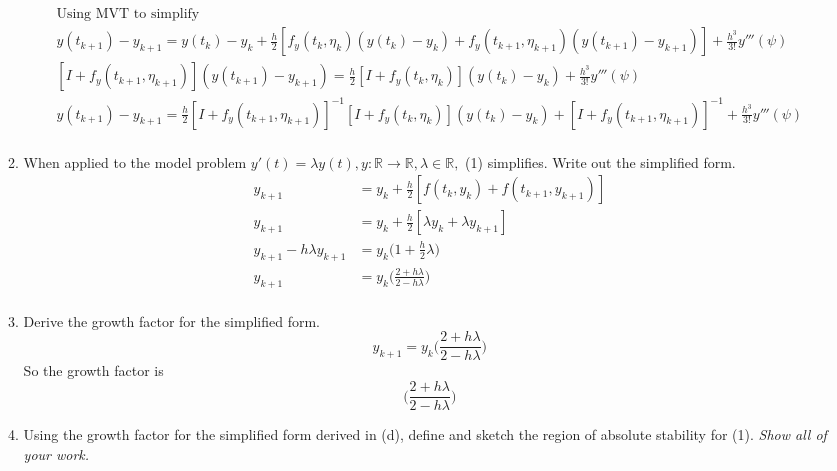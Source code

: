 \documentclass{article}
\begin{document}
\begin{enumerate}
\begin{enumerate}
\begin{align*}
                    \text{Using MVT to simplify} \\
                    y(t_{k+1}) - y_{k+1} = 
                    y(t_k) - y_k + \frac{h}{2}
                    [f_y (t_k, \eta_k)(y(t_k) - y_k) 
                    + f_y (t_{k+1}, \eta_{k+1})(y(t_{k+1}) - y_{k+1})]
                    + \frac{h^3}{3!}y'''(\psi) \\
                    [I + f_y (t_{k+1}, \eta_{k+1})](y(t_{k+1}) - y_{k+1}) 
                    = \frac{h}{2}
                    [I + f_y (t_k, \eta_k)](y(t_k) - y_k)
                    + \frac{h^3}{3!}y'''(\psi) \\
                    y(t_{k+1}) - y_{k+1}
                    = \frac{h}{2}
                    [I + f_y (t_{k+1}, \eta_{k+1})]^{-1}
                    [I + f_y (t_k, \eta_k)](y(t_k) - y_k)
                    + [I + f_y (t_{k+1}, \eta_{k+1})]^{-1}
                    + \frac{h^3}{3!}y'''(\psi) \\
                \end{align*}
            \item When applied to the model problem $y'(t) = \lambda y(t),
                y: \mathbb{R} \rightarrow \mathbb{R}, \lambda \in 
                \mathbb{R},$ (1) simplifies. Write out the simplified form.
                \begin{align*}
                y_{k+1} &= y_k + \frac{h}{2}[f(t_k,y_k) 
                + f(t_{k+1}, y_{k+1})] \\
                y_{k+1} &= y_k + \frac{h}{2}[\lambda y_k
                + \lambda y_{k+1}] \\
                y_{k+1} - h\lambda y_{k+1} &= 
                y_k \bigg( 1 +  \frac{h}{2}\lambda \bigg) \\
                y_{k+1} &= y_k \bigg( \frac{2 + h\lambda}
                {2-h\lambda}\bigg) \\
                \end{align*}
            \item Derive the growth factor for the simplified form.
                \[y_{k+1} = y_k \bigg( \frac{2 + h\lambda} 
                {2-h\lambda}\bigg) \]
                So the growth factor is 
                \[ \bigg(  \frac{2 + h \lambda}{2-h\lambda} \bigg) \]
            \item Using the growth factor for the simplified form derived
                in (d), define and sketch the region of absolute stability
                for (1). \textit{Show all of your work.}
                \begin{align*}

\end{align*}
\end{enumerate}
\end{enumerate}
\end{document}
